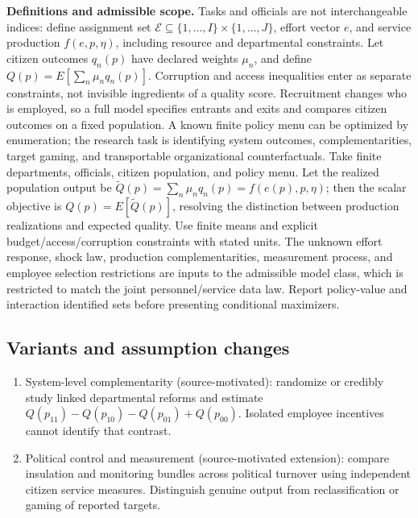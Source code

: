 \documentclass[11pt,a4paper]{article}
\begin{document}
\textbf{Definitions and admissible scope.} Tasks and officials are not interchangeable indices: define assignment set \(\mathcal E\subseteq\{1,\ldots,I\}\times\{1,\ldots,J\}\), effort vector \(e\), and service production \(f(e,p,\eta)\), including resource and departmental constraints. Let citizen outcomes \(q_n(p)\) have declared weights \(\mu_n\), and define \(Q(p)=E[\sum_n\mu_nq_n(p)]\). Corruption and access inequalities enter as separate constraints, not invisible ingredients of a quality score. Recruitment changes who is employed, so a full model specifies entrants and exits and compares citizen outcomes on a fixed population. A known finite policy menu can be optimized by enumeration; the research task is identifying system outcomes, complementarities, target gaming, and transportable organizational counterfactuals. Take finite departments, officials, citizen population, and policy menu. Let the realized population output be \(\widetilde Q(p)=\sum_n\mu_nq_n(p)=f(e(p),p,\eta)\); then the scalar objective is \(Q(p)=E[\widetilde Q(p)]\), resolving the distinction between production realizations and expected quality. Use finite means and explicit budget/access/corruption constraints with stated units. The unknown effort response, shock law, production complementarities, measurement process, and employee selection restrictions are inputs to the admissible model class, which is restricted to match the joint personnel/service data law. Report policy-value and interaction identified sets before presenting conditional maximizers.
\subsection*{Variants and assumption changes}
\begin{enumerate}
\item System-level complementarity (source-motivated): randomize or credibly study linked departmental reforms and estimate \(Q(p_{11})-Q(p_{10})-Q(p_{01})+Q(p_{00})\). Isolated employee incentives cannot identify that contrast.
\item Political control and measurement (source-motivated extension): compare insulation and monitoring bundles across political turnover using independent citizen service measures. Distinguish genuine output from reclassification or gaming of reported targets.
\end{enumerate}
\end{document}
